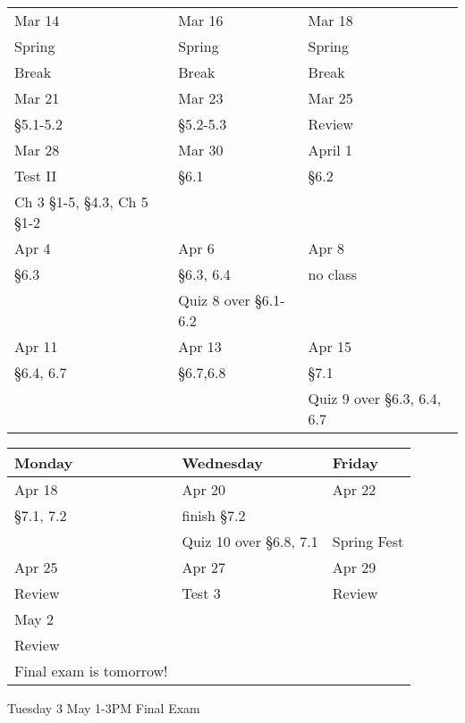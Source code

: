 \documentclass[11pt]{article}
\begin{document}
\begin{tabular}{|l|l|l|}
\hline
Mar 14& Mar 16 &Mar 18 \\
Spring&Spring&Spring\\
Break&Break&Break\\
\hline
Mar 21& Mar 23 & Mar 25 \\
\S 5.1-5.2& \S 5.2-5.3 &Review \\
\hline
Mar 28&Mar 30& April 1\\
Test II & \S 6.1 & \S 6.2 \\
Ch 3 \S 1-5, \S 4.3, Ch 5 \S 1-2 \quad&&\\
\hline
Apr 4 & Apr 6 & Apr 8 \\
\S 6.3 & \S 6.3, 6.4 & no class \\
& Quiz 8 over \S 6.1-6.2 & \\
\hline
Apr 11 & Apr 13 & Apr 15 \\
\S 6.4, 6.7 & \S 6.7,6.8 & \S 7.1 \\
&& Quiz 9 over \S 6.3, 6.4, 6.7 \\
\hline
\end{tabular}

\newpage

\begin{tabular}{|l|l|l|}
\hline
Monday & Wednesday & Friday \\
\hline \hline
Apr 18&Apr 20&Apr 22\\
\S 7.1, 7.2&finish \S 7.2&\\
&Quiz 10 over \S 6.8, 7.1&Spring Fest\\
\hline
Apr 25& Apr 27 & Apr 29\\
Review&Test 3& Review \\
\hline
May 2&&\\
Review &&\\
Final exam is tomorrow!&&\\
\hline
\end{tabular}
Tuesday 3 May 1-3PM Final Exam
\end{document}
